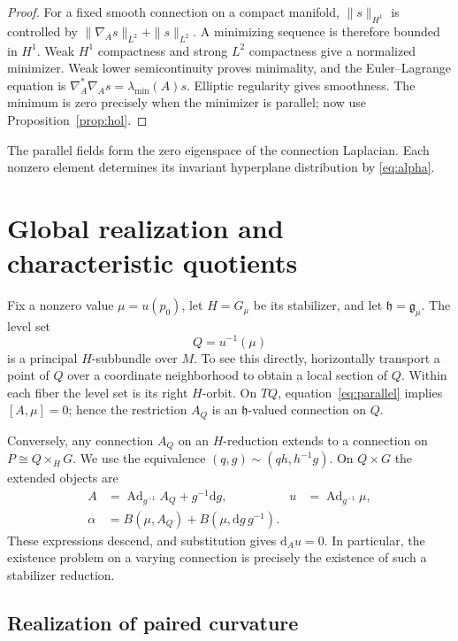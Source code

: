 \documentclass[11pt,a4paper]{article}
\numberwithin{equation}{section}
\theoremstyle{definition}
\theoremstyle{remark}
\newcommand{\g}{\mathfrak g}
\newcommand{\h}{\mathfrak h}
\newcommand{\Ad}{\operatorname{Ad}}
\newcommand{\dd}{\mathrm d}
\begin{document}
\begin{proof}
For a fixed smooth connection on a compact manifold,
$\|s\|_{H^1}$ is controlled by
$\|\nabla_As\|_{L^2}+\|s\|_{L^2}$. A minimizing sequence is therefore
bounded in $H^1$. Weak $H^1$ compactness and strong $L^2$ compactness give a
normalized minimizer. Weak lower semicontinuity proves minimality, and the
Euler--Lagrange equation is
$\nabla_A^*\nabla_As=\lambda_{\min}(A)s$. Elliptic regularity gives smoothness.
The minimum is zero precisely when the minimizer is parallel; now use
Proposition~\ref{prop:hol}.
\end{proof}

The parallel fields form the zero eigenspace of the connection Laplacian.
Each nonzero element determines its invariant hyperplane distribution by
\eqref{eq:alpha}.

\section{Global realization and characteristic quotients}
\label{sec:global}

Fix a nonzero value $\mu=u(p_0)$, let $H=G_\mu$ be its stabilizer, and let
$\h=\g_\mu$. The level set
\begin{equation}\label{eq:Q}
 Q=u^{-1}(\mu)
\end{equation}
is a principal $H$-subbundle over $M$. To see this directly, horizontally
transport a point of $Q$ over a coordinate neighborhood to obtain a local
section of $Q$. Within each fiber the level set is its right $H$-orbit.
On $TQ$, equation~\eqref{eq:parallel} implies $[A,\mu]=0$; hence the
restriction $A_Q$ is an $\h$-valued connection on $Q$.

Conversely, any connection $A_Q$ on an $H$-reduction extends to a connection
on $P\cong Q\times_H G$. We use the equivalence
$(q,g)\sim(qh,h^{-1}g)$. On $Q\times G$ the extended objects are
\begin{align}
 A&=\Ad_{g^{-1}}A_Q+g^{-1}\dd g,
 &u&=\Ad_{g^{-1}}\mu,\label{eq:extension}\\
 \alpha&=B(\mu,A_Q)+B(\mu,\dd g\,g^{-1}).\label{eq:coupling}
\end{align}
These expressions descend, and substitution gives $\dd_Au=0$. In
particular, the existence problem on a varying connection is precisely the
existence of such a stabilizer reduction.

\subsection{Realization of paired curvature}
\end{document}
